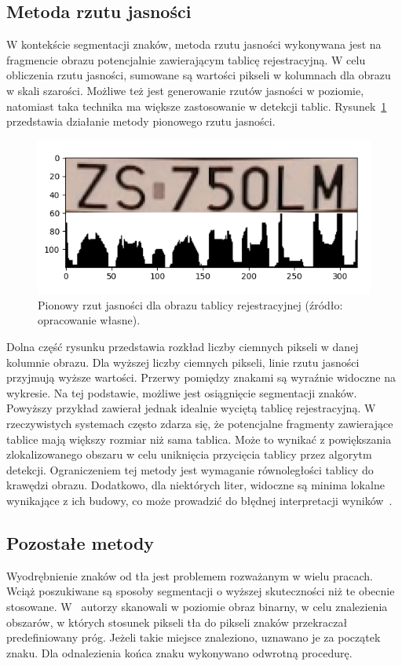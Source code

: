 \subsection{Metoda rzutu jasności}
W kontekście segmentacji znaków, metoda rzutu jasności wykonywana jest na fragmencie obrazu potencjalnie zawierającym tablicę rejestracyjną.
W celu obliczenia rzutu jasności, sumowane są wartości pikseli w kolumnach dla obrazu w skali szarości.
Możliwe też jest generowanie rzutów jasności w poziomie, natomiast taka technika ma większe zastosowanie w detekcji tablic.
Rysunek~\ref{fig:hist_projection} przedstawia działanie metody pionowego rzutu jasności.
\begin{figure}[!ht]
    \centering
    \includegraphics[scale=0.6]{Pictures/hist_projection}
    \caption{Pionowy rzut jasności dla obrazu tablicy rejestracyjnej (źródło: opracowanie własne).}
    \label{fig:hist_projection}
\end{figure}
\FloatBarrier
Dolna część rysunku przedstawia rozkład liczby ciemnych pikseli w danej kolumnie obrazu.
Dla wyższej liczby ciemnych pikseli, linie rzutu jasności przyjmują wyższe wartości.
Przerwy pomiędzy znakami są wyraźnie widoczne na wykresie.
Na tej podstawie, możliwe jest osiągnięcie segmentacji znaków.
Powyższy przykład zawierał jednak idealnie wyciętą tablicę rejestracyjną.
W rzeczywistych systemach często zdarza się, że potencjalne fragmenty zawierające tablice mają większy rozmiar niż sama tablica.
Może to wynikać z powiększania zlokalizowanego obszaru w celu uniknięcia przycięcia tablicy przez algorytm detekcji.
Ograniczeniem tej metody jest wymaganie równoległości tablicy do krawędzi obrazu.
Dodatkowo, dla niektórych liter, widoczne są minima lokalne wynikające z ich budowy, co może prowadzić do błędnej interpretacji wyników~\cite{Półrolniczak_2012}.

\subsection{Pozostałe metody}
Wyodrębnienie znaków od tła jest problemem rozważanym w wielu pracach.
Wciąż poszukiwane są sposoby segmentacji o wyższej skuteczności niż te obecnie stosowane.
W~\cite{686064} autorzy skanowali w poziomie obraz binarny, w celu znalezienia obszarów, w których stosunek pikseli tła do pikseli znaków przekraczał predefiniowany próg.
Jeżeli takie miejsce znaleziono, uznawano je za początek znaku.
Dla odnalezienia końca znaku wykonywano odwrotną procedurę.

